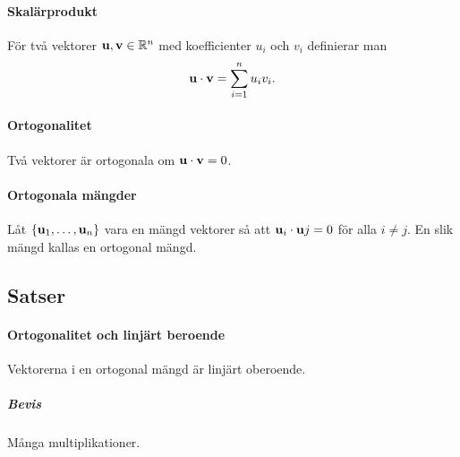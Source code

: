 \paragraph{Skalärprodukt}
För två vektorer $\vect{u}, \vect{v}\in\R^n$ med koefficienter $u_i$ och $v_i$ definierar man
\begin{align*}
	\vect{u}\cdot\vect{v} = \sum\limits_{i = 1}^n u_iv_i.
\end{align*}

\paragraph{Ortogonalitet}
Två vektorer är ortogonala om $\vect{u}\cdot\vect{v} = 0$.

\paragraph{Ortogonala mängder}
Låt $\{\vect{u}_1, \dots, \vect{u}_n\}$ vara en mängd vektorer så att $\vect{u}_i\cdot\vect{u}j = 0$ för alla $i\neq j$. En slik mängd kallas en ortogonal mängd.

\subsection{Satser}

\paragraph{Ortogonalitet och linjärt beroende}
Vektorerna i en ortogonal mängd är linjärt oberoende.

\subparagraph{Bevis}
Många multiplikationer.